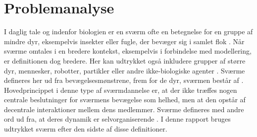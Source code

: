 \chapter{Problemanalyse}\label{ch:problemanalyse}
I daglig tale og indenfor biologien er en sværm ofte en betegnelse for en gruppe af mindre dyr, eksempelvis insekter eller fugle, der bevæger sig i samlet flok \cite{definition}. Når sværme omtales i en bredere kontekst, eksempelvis i forbindelse med modellering, er definitionen dog bredere. Her kan udtrykket også inkludere grupper af større dyr, mennesker, robotter, partikler eller andre ikke-biologiske agenter \cite{rosenberg2012}. Sværme defineres her ud fra bevægelsesmønstrene, frem for de dyr, sværmen består af \cite{biofoundations}. Hovedprincippet i denne type af sværmdannelse er, at der ikke træffes nogen centrale beslutninger for sværmens bevægelse som helhed, men at den opstår af decentrale interaktioner mellem dens medlemmer. Sværme defineres med andre ord ud fra, at deres dynamik er selvorganiserende \cite{kelso1995}. I denne rapport bruges udtrykket sværm efter den sidste af disse definitioner. 